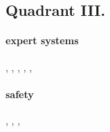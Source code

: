 \subsection{Quadrant III.}
\paragraph{expert systems}
\cite{Swartout1983-ko}, \cite{Rouse1986-dz}, \cite{Ridgeway1998-lv}, \cite{Lacave2002-cu}, \cite{Van_Belle2012-dt}, 

\paragraph{safety}
\cite{Amodei2016-xi}, \cite{Otte2013-oo}, \cite{Zhang2014-he}, \cite{Crum2004-xy}


